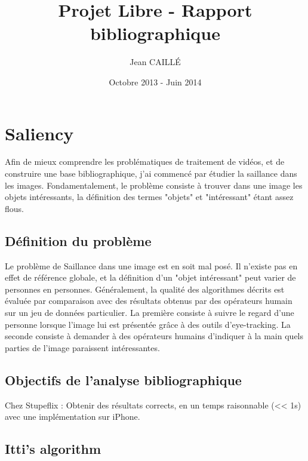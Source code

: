\documentclass[12pt,a4paper]{article}
\title{Projet Libre - Rapport bibliographique}
\date{Octobre 2013 - Juin 2014}
\author{Jean CAILLÉ}
\begin{document}
\maketitle

\section{Saliency}
Afin de mieux comprendre les problématiques de traitement de vidéos, et de construire une base bibliographique, j'ai commencé par étudier la saillance dans les images. Fondamentalement, le problème consiste à trouver dans une image les objets intéressants, la définition des termes "objets" et "intéressant" étant assez flous. 

\subsection{Définition du problème}
Le problème de Saillance dans une image est en soit mal posé. Il n'existe pas en effet de référence globale, et la définition d'un "objet intéressant" peut varier de personnes en personnes. Généralement, la qualité des algorithmes décrits est évaluée par comparaison avec des résultats obtenus par des opérateurs humain sur un jeu de données particulier. La première consiste à suivre le regard d'une personne lorsque l'image lui est présentée grâce à des outils d'eye-tracking. La seconde consiste à demander à des opérateurs humains d'indiquer à la main quels parties de l'image paraissent intéressantes.

\subsection{Objectifs de l'analyse bibliographique}
Chez Stupeflix : Obtenir des résultats corrects, en un temps raisonnable (<< 1s) avec une implémentation sur iPhone.

\subsection{Itti's algorithm}

\end{document}
